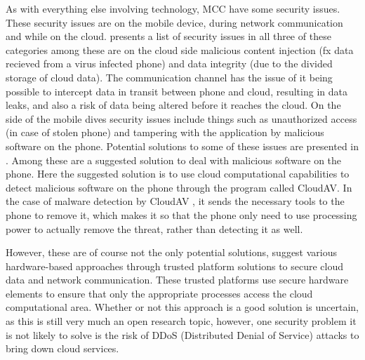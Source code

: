 As with everything else involving technology, MCC have some security issues.
These security issues are on the mobile device, during network communication and while on the cloud.
\citet{6923101} presents a list of security issues in all three of these categories among these are on the cloud side malicious content injection (fx data recieved from a virus infected phone) and data integrity (due to the divided storage of cloud data).
The communication channel has the issue of it being possible to intercept data in transit between phone and cloud, resulting in data leaks, and also a risk of data being altered before it reaches the cloud.
On the side of the mobile dives security issues include things such as unauthorized access (in case of stolen phone) and tampering with the application by malicious software on the phone.
Potential solutions to some of these issues are presented in \citet{6583635}.
Among these are a suggested solution to deal with malicious software on the phone.
Here the suggested solution is to use cloud computational capabilities to detect malicious software on the phone through the program called CloudAV.
In the case of malware detection by CloudAV \citep{Oberheide:2008:CNA:1496711.1496718}, it sends the necessary tools to the phone to remove it, which makes it so that the phone only need to use processing power to actually remove the threat, rather than detecting it as well.

However, these are of course not the only potential solutions, \citet{7056876} suggest various hardware-based approaches through trusted platform solutions to secure cloud data and network communication.
These trusted platforms use secure hardware elements to ensure that only the appropriate processes access the cloud computational area.
Whether or not this approach is a good solution is uncertain, as this is still very much an open research topic, however, one security problem it is not likely to solve is the risk of DDoS (Distributed Denial of Service) attacks to bring down cloud services.

